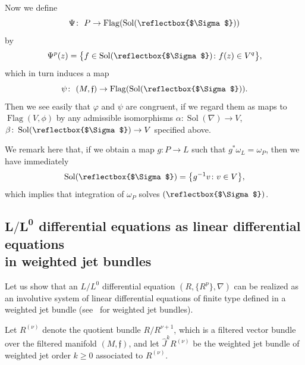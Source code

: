 \documentclass[10pt,a4paper]{amsart}
\newcommand{\f}{\mathfrak f}
\newcommand{\wJ}{\widehat J}
\newcommand{\Flag}{\operatorname{Flag}}
\newcommand{\Sol}{\operatorname{Sol}}
\DeclareRobustCommand{\amgiS}{\text{\reflectbox{$\Sigma$}}}
\numberwithin{equation}{section}
\begin{document}
Now we define
\[
	\Psi\colon\ P \to \Flag(\Sol( \amgiS))
\]
by
\[
	\Psi^p(z) = \big\{ f \in \Sol(\amgiS) \colon f(z) \in V^q \big\},
\]
which in turn induces a map
\[
	\psi\colon\ (M, \f) \to \Flag(\Sol(\amgiS)).
\]
Then we see easily that $\varphi$ and $\psi$ are congruent,
if we regard them as maps to $\Flag(V, \phi)$
by any admissible isomorphisms $\alpha\colon\Sol(\nabla) \to V$, $\beta\colon \Sol(\amgiS) \to V$ specified above.

We remark here that, if we obtain a map
$g\colon P \to L$ such that $g^* \omega_L = \omega_P$,
then we have immediately
\[
	\Sol(\amgiS) = \big\{ g^{-1}v \colon v \in V \big\},
\]
which implies that integration of $\omega_P$ solves $(\amgiS)$.


\subsection[L/L0 differential equations as linear differential equations in weighted jet bundles]
{$\boldsymbol{L/L^0}$ differential equations as linear differential equations \\in weighted jet bundles}

Let us show that an $L/L^0$ differential equation
$(R, \{R^p\}, \nabla)$ can be realized as an involutive system of linear differential equations of
finite type defined in a weighted jet bundle (see~\cite{Mor2002} for weighted jet bundles).


Let $R^{(\nu)}$ denote the quotient bundle $R/R^{\nu+1}$, which is a filtered vector bundle over the filtered manifold $(M,\f)$, and let $\wJ^{k}R^{(\nu)}$ be the weighted jet bundle of weighted jet order $k\ge 0$ associated to $R^{(\nu)}$.
\end{document}
